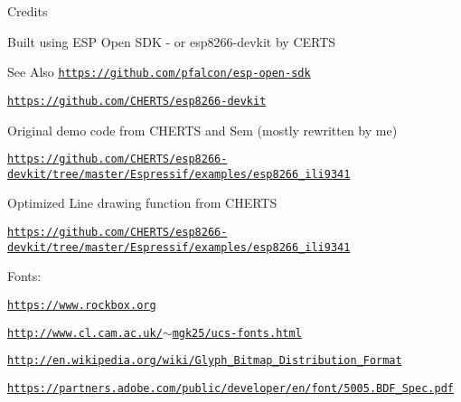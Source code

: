\begin{DoxyParagraph}{Credits}

\begin{DoxyItemize}
\item Built using E\-S\-P Open S\-D\-K -\/ or esp8266-\/devkit by C\-E\-R\-T\-S 
\end{DoxyItemize}
\end{DoxyParagraph}
\begin{DoxySeeAlso}{See Also}
\href{https://github.com/pfalcon/esp-open-sdk}{\tt https\-://github.\-com/pfalcon/esp-\/open-\/sdk} 

\href{https://github.com/CHERTS/esp8266-devkit}{\tt https\-://github.\-com/\-C\-H\-E\-R\-T\-S/esp8266-\/devkit}
\begin{DoxyItemize}
\item Original demo code from C\-H\-E\-R\-T\-S and Sem (mostly rewritten by me) 
\end{DoxyItemize}

\href{https://github.com/CHERTS/esp8266-devkit/tree/master/Espressif/examples/esp8266_ili9341}{\tt https\-://github.\-com/\-C\-H\-E\-R\-T\-S/esp8266-\/devkit/tree/master/\-Espressif/examples/esp8266\-\_\-ili9341}
\begin{DoxyItemize}
\item Optimized Line drawing function from C\-H\-E\-R\-T\-S 
\end{DoxyItemize}

\href{https://github.com/CHERTS/esp8266-devkit/tree/master/Espressif/examples/esp8266_ili9341}{\tt https\-://github.\-com/\-C\-H\-E\-R\-T\-S/esp8266-\/devkit/tree/master/\-Espressif/examples/esp8266\-\_\-ili9341}
\begin{DoxyItemize}
\item Fonts\-: 
\end{DoxyItemize}

\href{https://www.rockbox.org}{\tt https\-://www.\-rockbox.\-org} 

\href{http://www.cl.cam.ac.uk/~mgk25/ucs-fonts.html}{\tt http\-://www.\-cl.\-cam.\-ac.\-uk/$\sim$mgk25/ucs-\/fonts.\-html} 

\href{http://en.wikipedia.org/wiki/Glyph_Bitmap_Distribution_Format}{\tt http\-://en.\-wikipedia.\-org/wiki/\-Glyph\-\_\-\-Bitmap\-\_\-\-Distribution\-\_\-\-Format} 

\href{https://partners.adobe.com/public/developer/en/font/5005.BDF_Spec.pdf}{\tt https\-://partners.\-adobe.\-com/public/developer/en/font/5005.\-B\-D\-F\-\_\-\-Spec.\-pdf} 


\end{DoxySeeAlso}
